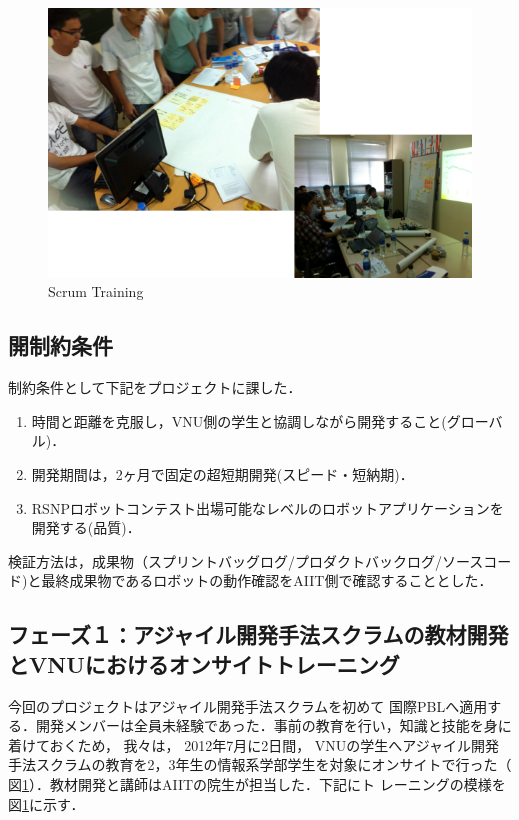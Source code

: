 \documentclass[a4j, 12Q, twocolumn, twoside]{jsarticle}
\begin{document}
\begin{figure}[htb]
  \begin{center}
    \includegraphics[width=\columnwidth]{./figures/training.png}
    \caption{Scrum Training}
    \label{fig:training}
  \end{center}
\end{figure}

\subsection{開制約条件}
制約条件として下記をプロジェクトに課した．
\begin{enumerate}
\item 時間と距離を克服し，VNU側の学生と協調しながら開発すること(グローバル)．
\item 開発期間は，2ヶ月で固定の超短期開発(スピード・短納期)．
\item RSNPロボットコンテスト出場可能なレベルのロボットアプリケーションを開発する(品質)．
\end{enumerate}

検証方法は，成果物（スプリントバッグログ/プロダクトバックログ/ソースコード)と最終成果物であるロボットの動作確認をAIIT側で確認することとした．

\subsection{フェーズ１：アジャイル開発手法スクラムの教材開発とVNUにおけるオンサイトトレーニング}
今回のプロジェクトはアジャイル開発手法スクラムを初めて
国際PBLへ適用する．開発メンバーは全員未経験であった．事前の教育を行い，知識と技能を身に着けておくため，
我々は， 2012年7月に2日間，
VNUの学生へアジャイル開発手法スクラムの教育を2，3年生の情報系学部学生を対象にオンサイトで行った（
図\ref{fig:training}）．教材開発と講師はAIITの院生が担当した．下記にト
レーニングの模様を図\ref{fig:training}に示す．
\end{document}
